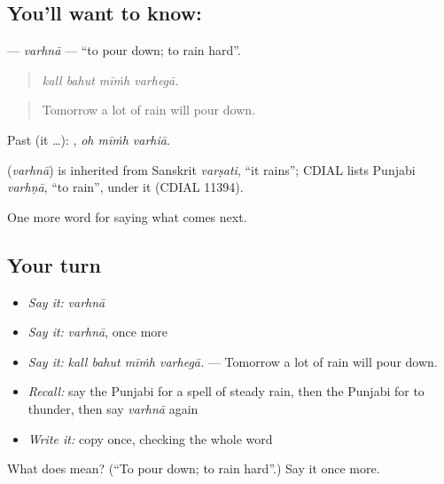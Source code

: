 \subsection*{You'll want to know: }
\textbf{} — \emph{varhnā} — \textquotedblleft{}to pour down; to rain hard\textquotedblright{}.

\begin{quote}
   
\end{quote}

\begin{quote}
\emph{kall bahut mīṁh varhegā.}
\end{quote}

\begin{quote}
Tomorrow a lot of rain will pour down.
\end{quote}

Past (it …):   , \emph{oh mīṁh varhiā}.

\begin{cousinweb}
\textbf{} (\emph{varhnā}) is inherited from Sanskrit \emph{varṣati}, \textquotedblleft{}it rains\textquotedblright{}; CDIAL lists Punjabi \emph{varhṇā}, \textquotedblleft{}to rain\textquotedblright{}, under it (CDIAL 11394).
\end{cousinweb}

\begin{grammarlens}[title={What you've built}]
One more word for saying what comes next.
\end{grammarlens}

\subsection*{Your turn}
\begin{itemize}
\raggedright
  \item \emph{Say it:} \emph{varhnā}
  \item \emph{Say it:} \emph{varhnā}, once more
  \item \emph{Say it:} \emph{kall bahut mīṁh varhegā.} — Tomorrow a lot of rain will pour down.
  \item \emph{Recall:} say the Punjabi for a spell of steady rain, then the Punjabi for to thunder, then say \emph{varhnā} again
  \item \emph{Write it:} copy \textbf{} once, checking the whole word
\end{itemize}

\begin{tcolorbox}[breakable,colback=teal!4,colframe=teal!35!black,title={Before you move on}]
What does  mean? (\textquotedblleft{}To pour down; to rain hard\textquotedblright{}.) Say it once more.
\end{tcolorbox}
